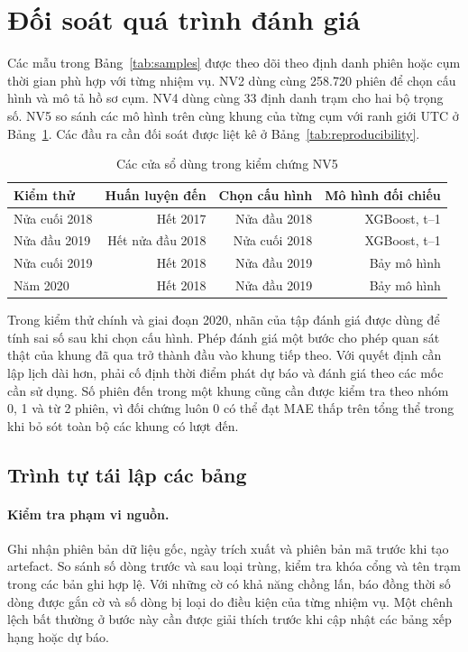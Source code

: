\documentclass[conference,a4paper]{IEEEtran}
\begin{document}
\clearpage
\section{Đối soát quá trình đánh giá}
Các mẫu trong Bảng~\ref{tab:samples} được theo dõi theo định danh phiên hoặc cụm thời gian phù hợp với từng nhiệm vụ. NV2 dùng cùng 258.720 phiên để chọn cấu hình và mô tả hồ sơ cụm. NV4 dùng cùng 33 định danh trạm cho hai bộ trọng số. NV5 so sánh các mô hình trên cùng khung của từng cụm với ranh giới UTC ở Bảng~\ref{tab:all_windows}. Các đầu ra cần đối soát được liệt kê ở Bảng~\ref{tab:reproducibility}.

\begin{table}[!t]
\caption{Các cửa sổ dùng trong kiểm chứng NV5}
\label{tab:all_windows}
\centering\footnotesize
\setlength{\tabcolsep}{3pt}
\begin{tabularx}{\textwidth}{@{}Xrrr@{}}
\toprule
\textbf{Kiểm thử} & \textbf{Huấn luyện đến} & \textbf{Chọn cấu hình} & \textbf{Mô hình đối chiếu} \\
\midrule
Nửa cuối 2018 & Hết 2017 & Nửa đầu 2018 & XGBoost, t–1 \\
Nửa đầu 2019 & Hết nửa đầu 2018 & Nửa cuối 2018 & XGBoost, t–1 \\
Nửa cuối 2019 & Hết 2018 & Nửa đầu 2019 & Bảy mô hình \\
Năm 2020 & Hết 2018 & Nửa đầu 2019 & Bảy mô hình \\
\bottomrule
\end{tabularx}
\end{table}


Trong kiểm thử chính và giai đoạn 2020, nhãn của tập đánh giá được dùng để tính sai số sau khi chọn cấu hình. Phép đánh giá một bước cho phép quan sát thật của khung đã qua trở thành đầu vào khung tiếp theo. Với quyết định cần lập lịch dài hơn, phải cố định thời điểm phát dự báo và đánh giá theo các mốc cần sử dụng. Số phiên đến trong một khung cũng cần được kiểm tra theo nhóm 0, 1 và từ 2 phiên, vì đối chứng luôn 0 có thể đạt MAE thấp trên tổng thể trong khi bỏ sót toàn bộ các khung có lượt đến.


\subsection{Trình tự tái lập các bảng}

\paragraph{Kiểm tra phạm vi nguồn.}
Ghi nhận phiên bản dữ liệu gốc, ngày trích xuất và phiên bản mã trước khi tạo artefact. So sánh số dòng trước và sau loại trùng, kiểm tra khóa cổng và tên trạm trong các bản ghi hợp lệ. Với những cờ có khả năng chồng lấn, báo đồng thời số dòng được gắn cờ và số dòng bị loại do điều kiện của từng nhiệm vụ. Một chênh lệch bất thường ở bước này cần được giải thích trước khi cập nhật các bảng xếp hạng hoặc dự báo.
\end{document}
